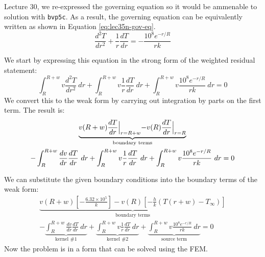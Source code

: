  Lecture 30, we re-expressed the governing equation so it would be ammenable to solution with \lstinline[style=myMatlab]{bvp5c}.  As a result, the governing equation can be equivalently written as shown in Equation \ref{eq:lec35n-gov-eq}.
\begin{equation}
\frac{d^2T}{dr^2}+\frac{1}{r}\frac{dT}{dr} = -\frac{10^8e^{-r/R}}{rk}
\label{eq:lec35n-gov-eq}
\end{equation}

We start by expressing this equation in the strong form of the weighted residual statement:
\begin{equation*}
\int_{R}^{R+w} v \frac{d^2T}{dr^2} \ dr + \int_{R}^{R+w} v \frac{1}{r}\frac{dT}{dr} \ dr + \int_{R}^{R+w} v \frac{10^8e^{-r/R}}{rk} \ dr = 0
\end{equation*}
We convert this to the weak form by carrying out integration by parts on the first term.  The result is:
\begin{multline*}
\underbrace{v(R+w) \frac{dT}{dr}\Bigl|_{r=R+w} - v(R)\frac{dT}{dr}\Bigl|_{r=R}}_{\text{boundary terms}} \\
-\int_{R}^{R+w} \frac{dv}{dr}\frac{dT}{dr} \ dr +  \int_{R}^{R+w} v \frac{1}{r}\frac{dT}{dr} \ dr + \int_{R}^{R+w} v \frac{10^8e^{-r/R}}{rk} \ dr = 0
\end{multline*}

\noindent We can substitute the given boundary conditions into the boundary terms of the weak form:
\begin{multline*}
\underbrace{v(R+w) \left[-\frac{6.32\times 10^5}{k} \right] - v(R)\left[-\frac{h}{k}\left(T(r+w)-T_{\infty}\right) \right]}_{\text{boundary terms}} \\
-\underbrace{\int_{R}^{R+w} \frac{dv}{dr}\frac{dT}{dr} \ dr}_{\text{kernel \#1}} +\underbrace{\int_{R}^{R+w} v \frac{1}{r}\frac{dT}{dr} \ dr}_{\text{kernel \#2}} +\underbrace{\int_{R}^{R+w} v \frac{10^8e^{-r/R}}{rk} \ dr}_{\text{source term}} = 0
\end{multline*}
Now the problem is in a form that can be solved using the FEM.

